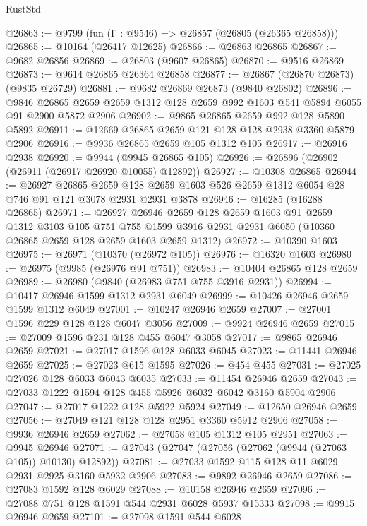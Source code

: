 \begin{lexlean}{RustStd}
\begin{coremodule}
@26863 := @9799 (fun (Γ : @9546) => @26857 (@26805 (@26365 @26858)))
@26865 := @10164 (@26417 @12625)
@26866 := @26863 @26865
@26867 := @9682 @26856
@26869 := @26803 (@9607 @26865)
@26870 := @9516 @26869
@26873 := @9614 @26865 @26364 @26858
@26877 := @26867 (@26870 @26873) (@9835 @26729)
@26881 := @9682 @26869 @26873 (@9840 @26802)
@26896 := @9846
    @26865
    @2659
    @2659
    @1312
    @128
    @2659
    @992
    @1603
    @541
    @5894
    @6055
    @91
    @2900
    @5872
    @2906
@26902 := @9865 @26865 @2659 @992 @128 @5890 @5892
@26911 := @12669 @26865 @2659 @121 @128 @128 @2938 @3360 @5879 @2906
@26916 := @9936 @26865 @2659 @105 @1312 @105
@26917 := @26916 @2938
@26920 := @9944 (@9945 @26865 @105)
@26926 := @26896 (@26902 (@26911 (@26917 @26920 @10055) @12892))
@26927 := @10308 @26865
@26944 := @26927
    @26865
    @2659
    @128
    @2659
    @1603
    @526
    @2659
    @1312
    @6054
    @28
    @746
    @91
    @121
    @3078
    @2931
    @2931
    @3878
@26946 := @16285 (@16288 @26865)
@26971 := @26927
    @26946
    @2659
    @128
    @2659
    @1603
    @91
    @2659
    @1312
    @3103
    @105
    @751
    @755
    @1599
    @3916
    @2931
    @2931
    @6050
    (@10360 @26865 @2659 @128 @2659 @1603 @2659 @1312)
@26972 := @10390 @1603
@26975 := @26971 (@10370 (@26972 @105))
@26976 := @16320 @1603
@26980 := @26975 (@9985 (@26976 @91 @751))
@26983 := @10404 @26865 @128 @2659
@26989 := @26980 (@9840 (@26983 @751 @755 @3916 @2931))
@26994 := @10417 @26946 @1599 @1312 @2931 @6049
@26999 := @10426 @26946 @2659 @1599 @1312 @6049
@27001 := @10247 @26946 @2659
@27007 := @27001 @1596 @229 @128 @128 @6047 @3056
@27009 := @9924 @26946 @2659
@27015 := @27009 @1596 @231 @128 @455 @6047 @3058
@27017 := @9865 @26946 @2659
@27021 := @27017 @1596 @128 @6033 @6045
@27023 := @11441 @26946 @2659
@27025 := @27023 @615 @1595
@27026 := @454 @455
@27031 := @27025 @27026 @128 @6033 @6043 @6035
@27033 := @11454 @26946 @2659
@27043 := @27033 @1222 @1594 @128 @455 @5926 @6032 @6042 @3160 @5904 @2906
@27047 := @27017 @1222 @128 @5922 @5924
@27049 := @12650 @26946 @2659
@27056 := @27049 @121 @128 @128 @2951 @3360 @5912 @2906
@27058 := @9936 @26946 @2659
@27062 := @27058 @105 @1312 @105 @2951
@27063 := @9945 @26946
@27071 := @27043 (@27047 (@27056 (@27062 (@9944 (@27063 @105)) @10130) @12892))
@27081 := @27033 @1592 @115 @128 @11 @6029 @2931 @2925 @3160 @5932 @2906
@27083 := @9892 @26946 @2659
@27086 := @27083 @1592 @128 @6029
@27088 := @10158 @26946 @2659
@27096 := @27088 @751 @128 @1591 @544 @2931 @6028 @5937 @15333
@27098 := @9915 @26946 @2659
@27101 := @27098 @1591 @544 @6028

\end{coremodule}
\end{lexlean}
